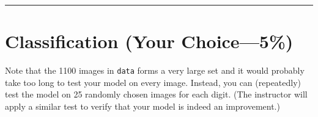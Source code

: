 \documentclass[12pt]{article}
\begin{document}
\vspace*{1\baselineskip}


\newpage
\hrule

\section{Classification \rm(Your Choice---5\%)}

Note that the 1100 images in {\tt data} forms a very large set
and it would probably take too long to test your model on every image.
Instead, you can (repeatedly) test the model on 25 randomly chosen
images for each digit.
(The instructor will apply a similar test to verify that your model is indeed
an improvement.)
\end{document}
